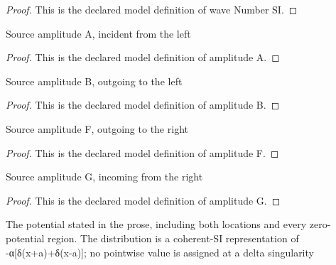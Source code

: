\begin{proof}
  This is the declared model definition of wave Number SI.
\end{proof}
\begin{definition}[amplitude A]
  \label{def:physics:phyx-mini-0602:phyxminiproblems-problemphyxmini0602-amplitudea}
  Source amplitude A, incident from the left
\end{definition}
\begin{proof}
  This is the declared model definition of amplitude A.
\end{proof}
\begin{definition}[amplitude B]
  \label{def:physics:phyx-mini-0602:phyxminiproblems-problemphyxmini0602-amplitudeb}
  Source amplitude B, outgoing to the left
\end{definition}
\begin{proof}
  This is the declared model definition of amplitude B.
\end{proof}
\begin{definition}[amplitude F]
  \label{def:physics:phyx-mini-0602:phyxminiproblems-problemphyxmini0602-amplitudef}
  Source amplitude F, outgoing to the right
\end{definition}
\begin{proof}
  This is the declared model definition of amplitude F.
\end{proof}
\begin{definition}[amplitude G]
  \label{def:physics:phyx-mini-0602:phyxminiproblems-problemphyxmini0602-amplitudeg}
  Source amplitude G, incoming from the right
\end{definition}
\begin{proof}
  This is the declared model definition of amplitude G.
\end{proof}
\begin{definition}
  \label{def:physics:phyx-mini-0602:phyxminiproblems-problemphyxmini0602-matchesdoubledeltascenario}
  The potential stated in the prose, including both locations and every zero-potential region. The distribution is a coherent-SI representation of -α[δ(x+a)+δ(x-a)]; no pointwise value is assigned at a delta singularity
\end{definition}
